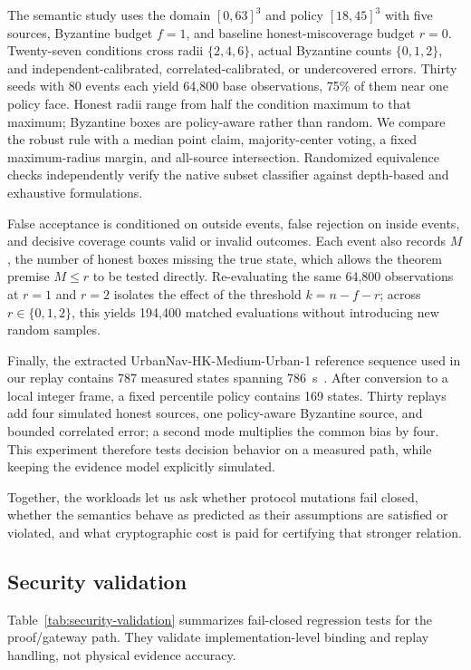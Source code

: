 \documentclass[preprint,review,12pt]{elsarticle}
\begin{document}
The semantic study uses the domain $[0,63]^3$ and policy $[18,45]^3$ with five sources, Byzantine budget $f=1$, and baseline honest-miscoverage budget $r=0$. Twenty-seven conditions cross radii $\{2,4,6\}$, actual Byzantine counts $\{0,1,2\}$, and independent-calibrated, correlated-calibrated, or undercovered errors. Thirty seeds with 80 events each yield 64,800 base observations, 75\% of them near one policy face. Honest radii range from half the condition maximum to that maximum; Byzantine boxes are policy-aware rather than random. We compare the robust rule with a median point claim, majority-center voting, a fixed maximum-radius margin, and all-source intersection. Randomized equivalence checks independently verify the native subset classifier against depth-based and exhaustive formulations.

False acceptance is conditioned on outside events, false rejection on inside events, and decisive coverage counts valid or invalid outcomes. Each event also records $M$, the number of honest boxes missing the true state, which allows the theorem premise $M\le r$ to be tested directly. Re-evaluating the same 64,800 observations at $r=1$ and $r=2$ isolates the effect of the threshold $k=n-f-r$; across $r\in\{0,1,2\}$, this yields 194,400 matched evaluations without introducing new random samples.

Finally, the extracted UrbanNav-HK-Medium-Urban-1 reference sequence used in our replay contains 787 measured states spanning 786~s~\cite{UrbanNav}. After conversion to a local integer frame, a fixed percentile policy contains 169 states. Thirty replays add four simulated honest sources, one policy-aware Byzantine source, and bounded correlated error; a second mode multiplies the common bias by four. This experiment therefore tests decision behavior on a measured path, while keeping the evidence model explicitly simulated.

Together, the workloads let us ask whether protocol mutations fail closed, whether the semantics behave as predicted as their assumptions are satisfied or violated, and what cryptographic cost is paid for certifying that stronger relation.
\subsection{Security validation}
Table~\ref{tab:security-validation} summarizes fail-closed regression tests for the proof/gateway path. They validate implementation-level binding and replay handling, not physical evidence accuracy.
\end{document}

